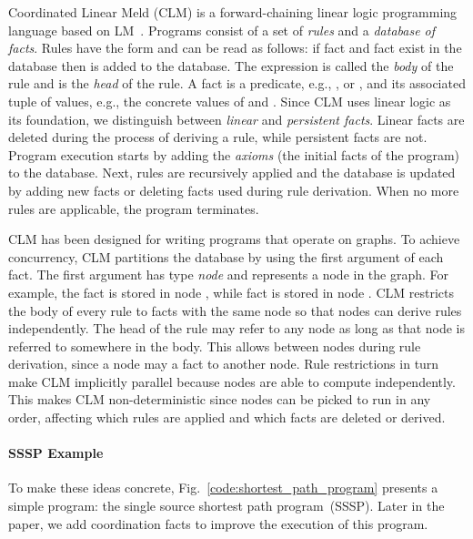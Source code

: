 Coordinated Linear Meld (CLM) is a forward-chaining linear logic programming
language based on LM~\cite{cruz-iclp14}.
Programs consist of a set of \emph{rules} and a \emph{database of facts}.
Rules have the form  and can be read as follows: if fact 
and fact  exist in the database then  is added to
the database. The expression  is called the \emph{body} of
the rule and  is the \emph{head} of the rule.
A fact is a predicate, e.g., ,  or , and its
associated tuple of values, e.g., the concrete values of  and
. Since CLM uses linear logic as its foundation, we distinguish between
\emph{linear} and \emph{persistent facts}. Linear facts are deleted during the
process of deriving a rule, while persistent facts are not.
Program execution starts by adding the \emph{axioms} (the initial facts of the
program) to the database. Next, rules are recursively applied and the
database is updated by adding new facts or deleting facts used during rule derivation.
When no more rules are applicable, the program terminates.

CLM has been designed for writing programs that operate on graphs. To achieve
concurrency, CLM partitions the database by using the first argument of each fact. The first argument has
type \emph{node} and represents a node in the graph. For example,
the fact  is stored in node , while
fact  is stored in node . CLM restricts the body of
every rule to facts with the same node so that nodes can derive rules
independently. The head of the rule may refer
to any node as long as that node is referred to somewhere in the body. This allows
 between nodes during rule derivation, since a node may
 a fact to another node.  Rule restrictions in turn make CLM
implicitly parallel because nodes are able to compute independently. This makes
CLM non-deterministic since nodes can be picked to run in any order, affecting
which rules are applied and which facts are deleted or derived.

\paragraph{SSSP Example}\label{sect:ssspex}
To make these ideas concrete, Fig.~\ref{code:shortest_path_program} presents
a simple program: the single source shortest path program~(SSSP). Later in the paper, we
add coordination facts to improve the execution of this program.

